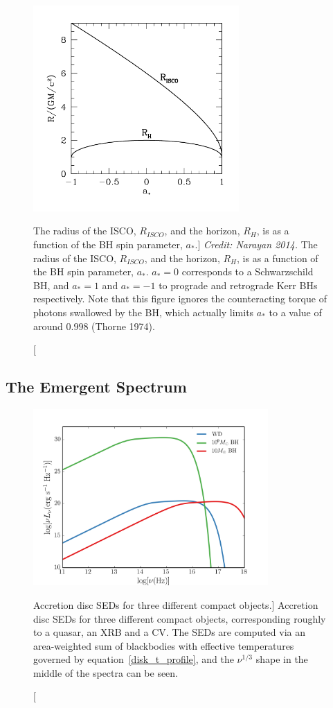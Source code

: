 \nocite{narayan2014, thorne1974}
\begin{figure}
\centering
\includegraphics[width=0.7\textwidth]{figures/01-intro/isco.png}
\caption
[The radius of the ISCO, $R_{ISCO}$, and the horizon, $R_H$,
is as a function of the BH spin parameter, $a_*$.]
{
{\sl Credit: Narayan 2014.}
The radius of the ISCO, $R_{ISCO}$, and the horizon, $R_H$,
is as a function of the BH spin parameter, $a_*$. 
$a_*=0$ corresponds to a Schwarzschild BH, and $a_*=1$ and $a_*=-1$
to prograde and retrograde Kerr BHs respectively. Note that
this figure ignores the counteracting torque of photons swallowed by the BH,
which actually limits $a_*$ to a value of around $0.998$ (Thorne 1974).  
} 
\label{fig:isco}
\end{figure}


\subsection{The Emergent Spectrum}


\begin{figure}
\centering
\includegraphics[width=0.8\textwidth]{figures/01-intro/disc_seds.png}
\caption
[Accretion disc SEDs for three different compact objects.]
{
Accretion disc SEDs for three different compact objects, corresponding roughly
to a quasar, an XRB and a CV. The SEDs are computed via an area-weighted sum
of blackbodies with effective temperatures governed by equation~\ref{disk_t_profile},
and the $\nu^{1/3}$ shape in the middle of the spectra can be seen.
} 
\label{fig:disc_seds}
\end{figure}

